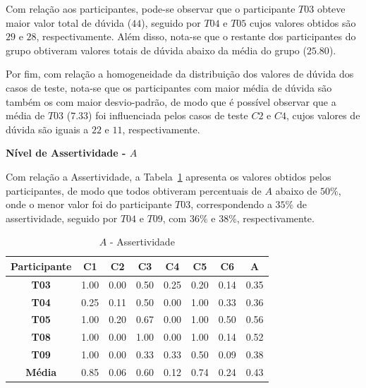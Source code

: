 Com relação aos participantes, pode-se observar que o participante $T03$ obteve maior valor total de dúvida ($44$), seguido por $T04$ e $T05$ cujos valores obtidos são $29$ e $28$, respectivamente. Além disso, nota-se que o restante dos participantes do grupo obtiveram valores totais de dúvida abaixo da média do grupo ($25.80$).

Por fim, com relação a homogeneidade da distribuição dos valores de dúvida dos casos de teste, nota-se que os participantes com maior média de dúvida são também os com maior desvio-padrão, de modo que é possível observar que a média de $T03$ ($7.33$) foi influenciada pelos casos de teste $C2$ e $C4$, cujos valores de dúvida são iguais a $22$ e $11$, respectivamente.

\textbf{Nível de Assertividade - $A$}

Com relação a Assertividade, a Tabela~\ref{tab:F3_A4_A} apresenta os valores obtidos pelos participantes, de modo que todos obtiveram percentuais de $A$ abaixo de $50\%$, onde o menor valor foi do participante $T03$, correspondendo a $35\%$ de assertividade, seguido por $T04$ e $T09$, com $36\%$ e $38\%$, respectivamente.

\begin{table}[htbp]
	\centering
	\caption{$A$ - Assertividade}
	\begin{tabular}{|c|c|c|c|c|c|c|c|}
		\hline
		\rowcolor[HTML]{D9D9D9} 
		\textbf{Participante} & \textbf{C1} & \textbf{C2} & \textbf{C3} & \textbf{C4} & \textbf{C5} & \textbf{C6} & \textbf{A} \\ \hline
		\rowcolor[HTML]{FFFFFF} 
		\textbf{T03} & 1.00 & 0.00 & 0.50 & 0.25 & 0.20 & 0.14 & 0.35 \\ \hline
		\rowcolor[HTML]{E7E6E6} 
		\textbf{T04} & 0.25 & 0.11 & 0.50 & 0.00 & 1.00 & 0.33 & 0.36 \\ \hline
		\rowcolor[HTML]{FFFFFF} 
		\textbf{T05} & 1.00 & 0.20 & 0.67 & 0.00 & 1.00 & 0.50 & 0.56 \\ \hline
		\rowcolor[HTML]{E7E6E6} 
		\textbf{T08} & 1.00 & 0.00 & 1.00 & 0.00 & 1.00 & 0.14 & 0.52 \\ \hline
		\rowcolor[HTML]{FFFFFF} 
		\textbf{T09} & 1.00 & 0.00 & 0.33 & 0.33 & 0.50 & 0.09 & 0.38 \\ \hline
		\rowcolor[HTML]{D0CECE} 
		\textbf{Média} & 0.85 & 0.06 & 0.60 & 0.12 & 0.74 & 0.24 & 0.43 \\ \hline
	\end{tabular}
	\label{tab:F3_A4_A}
\end{table}

